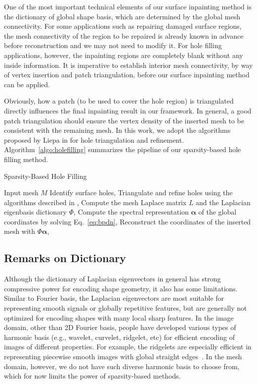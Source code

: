 One of the most important technical elements of our surface inpainting
method is the dictionary of global shape basis, which are determined by
the global mesh connectivity. For some applications such as repairing
damaged surface regions, the mesh connectivity of the region to be
repaired is already known in advance before reconstruction and we may
not need to modify it. For hole filling applications, however, the
inpainting regions are completely blank without any inside
information. It is imperative to establish interior mesh connectivity,
by way of vertex insertion and patch triangulation, before our surface
inpainting method can be applied.

Obviously, how a patch (to be used to cover the hole region) is
triangulated directly influences the final inpainting result in our
framework. In general, a good patch triangulation should ensure the
vertex density of the inserted mesh to be consistent with the
remaining mesh. In this work, we adopt the algorithms proposed by
Liepa in \cite{Liepa2003} for hole triangulation and refinement.
Algorithm~\ref{algo:holefilling} summarizes the pipeline of our
sparsity-based hole filling method.

\begin{algorithm}
\caption{Sparsity-Based Hole Filling}
\label{algo:holefilling}
\begin{algorithmic}[1]
  \REQUIRE Input mesh $M$
\STATE Identify surface holes,
\STATE Triangulate and refine holes using the algorithms described in
  \cite{Liepa2003},
\STATE Compute the mesh Laplace matrix $L$ and the Laplacian eigenbasis dictionary $\Phi$,
\STATE Compute the spectral representation $\mathbf{\alpha}$ of the global coordinates by solving Eq.~\ref{eq:bpdn},
\STATE Reconstruct the coordinates of the inserted mesh with $\Phi\mathbf{\alpha}$,
\ENDFOR
\end{algorithmic}
\end{algorithm}

\subsection{Remarks on Dictionary}
\label{sec:inpaint:remark}

Although the dictionary of Laplacian eigenvectors in general has strong
compressive power for encoding shape geometry, it also has some limitations.
Similar to Fourier basis, the Laplacian eigenvectors are most suitable for
representing smooth signals or globally repetitive features, but are generally
not optimized for encoding shapes with many local sharp features. In the image
domain, other than 2D Fourier basis, people have developed various types of
harmonic basis (e.g., wavelet, curvelet, ridgelet, etc) for efficient encoding
of images of different properties. For example, the ridgelets are especially
efficient in representing piecewise smooth images with global straight
edges~\cite{Fadili2012}. In the mesh domain, however, we do not have such
diverse harmonic basis to choose from, which for now limits the power of
sparsity-based methods.

